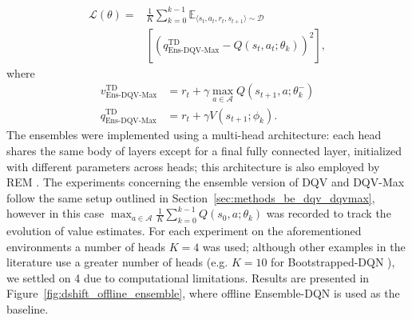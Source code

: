 \begin{equation}
  \begin{aligned}
    \mathcal{L}\left(\theta\right)=&\frac{1}{K}\sum_{k=0}^{k-1}\mathbb{E}_{\langle
                                     s_t,a_t,r_t,s_{t+1}\rangle\sim\mathcal{D}}\\
                                   &\left[{\left(q^{\scriptscriptstyle\textrm{TD}}_{\scriptscriptstyle\textrm{Ens-DQV-Max}}-Q\left(s_t,a_t;\theta_k\right)\right)}^2\right],
  \end{aligned}
\end{equation}
where
\begin{align}
  v^{\scriptscriptstyle
  \textrm{TD}}_{\scriptscriptstyle\textrm{Ens-DQV-Max}}&=r_t+\gamma\max_{a\in\mathcal{A}}Q\left(s_{t+1},a;\theta_k^{-}\right)\\
  q^{\scriptscriptstyle\textrm{TD}}_{\scriptscriptstyle\textrm{Ens-DQV-Max}}&=r_t+\gamma V\left(s_{t+1};\phi_k\right).
\end{align}
The ensembles were implemented using a multi-head architecture: each
head shares the same body of layers except for a final
fully connected layer, initialized with different parameters across
heads; this architecture is also employed by REM
\citep{agarwal2020optimistic}.
The experiments concerning the ensemble version of DQV and DQV-Max
follow the same setup outlined in
Section~\ref{sec:methods_be_dqv_dqvmax}, however in this case
$\max_{a\in\mathcal{A}}\frac{1}{K}\sum_{k=0}^{k-1}Q\left(s_0,a;\theta_k\right)$
was recorded to track the evolution of value estimates.
For each experiment on the aforementioned environments a number of
heads $K=4$ was used; although other examples in the literature use a
greater number of heads (e.g. $K=10$ for Bootstrapped-DQN
\citep{osband2016deep}), we settled on 4 due to computational
limitations. Results are presented in
Figure~\ref{fig:dshift_offline_ensemble}, where offline Ensemble-DQN
is used as the baseline.
